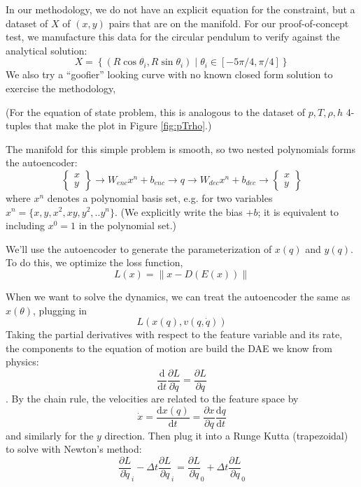 \documentclass[]{article}
\begin{document}
In our methodology, we do not have an explicit equation for the
constraint, but a dataset of $X$ of $(x,y)$ pairs that are on the manifold. For
our proof-of-concept test, we manufacture this data for the circular
pendulum to verify against the analytical solution:
\begin{equation}
X = \left\{ (R\cos\theta_i, R\sin\theta_i)\; | \;\theta_i \in [-5\pi/4,\pi/4] \right\}
\end{equation}
We also try a ``goofier'' looking curve with no known closed form
solution to exercise the methodology,

(For the equation of state problem, this is analogous to the dataset
of $p,T,\rho,h$ 4-tuples that make the plot in Figure \ref{fig:pTrho}.)

The manifold for this simple problem is smooth, so two nested
polynomials forms the autoencoder:
\[\left\{\begin{array}{c} x\\y\end{array}\right\}
\rightarrow W_{enc} x^n +b_{enc}\rightarrow q \rightarrow W_{dec} x^n +b_{dec}\rightarrow 
\left\{\begin{array}{c} x\\y\end{array}\right\}\]
where $x^n$ denotes a polynomial basis set, e.g. for two variables $x^n=\{x,y,x^2,xy,y^2,..y^n\}$.
(We explicitly write the bias \(+b\); it is equivalent to including
\(x^0=1\) in the polynomial set.) 

We'll use the autoencoder to generate the parameterization of \(x(q)\)
and \(y(q)\). To do this, we optimize the loss function,
\begin{equation}
L(x) = \left\| x-D(E(x)) \right\|
\end{equation}

When we want to solve the dynamics, we can treat the autoencoder the
same as \(x(\theta)\), plugging in
\[L(x(q),v(q,\dot{q}))\]
Taking the partial derivatives with respect to the feature variable and
its rate, the components to the equation of motion are build the DAE we know from physics:
\[\frac{\mathrm{d}}{\mathrm{d}t}\frac{\partial L}{\partial \dot{q}} = \frac{\partial L}{\partial q}\].
By the chain rule, the velocities are related to the
feature space by
\begin{equation}
\dot{x} = \frac{\mathrm{d}x(q)}{\mathrm{d}t} = \frac{\partial x}{\partial q}\frac{\mathrm{d}q}{\mathrm{d}t}
\end{equation}
and similarly for the \(y\) direction.
Then plug it into a Runge Kutta (trapezoidal) to solve with Newton's
method:
\[\frac{\partial L}{\partial \dot{q}}_i - \Delta t \frac{\partial L}{\partial q}_i = \frac{\partial L}{\partial \dot{q}}_0 + \Delta t \frac{\partial L}{\partial q}_0\]
\end{document}
